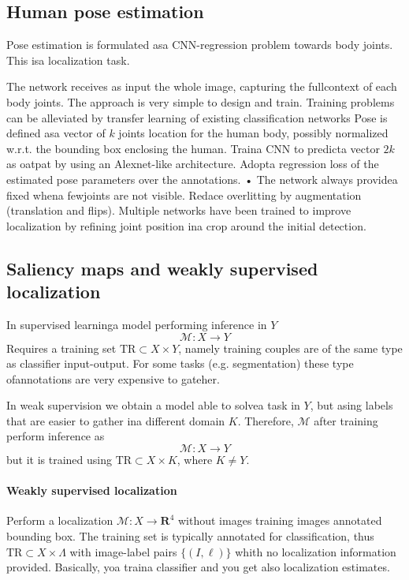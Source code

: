 \subsection{Human pose estimation}
Pose estimation is formulated asa CNN-regression problem towards body
joints. This isa localization task. 

The network receives as input the whole image, capturing the fullcontext of each body joints.
The approach is very simple to design and train. Training problems can
be alleviated by transfer learning of existing classification networks
Pose is defined asa vector of $k$ joints location for the human body,
possibly normalized w.r.t. the bounding box enclosing the human.
Traina CNN to predicta vector  $2k$ as oatpat by using an Alexnet-like
architecture.
Adopta regression loss of the estimated pose parameters over the
annotations.
• The network always providea fixed whena fewjoints are not visible.
Redace overlitting by augmentation (translation and flips).
Multiple networks have been trained to improve localization by refining
joint position ina crop around the initial detection.


\subsection{Saliency maps and weakly supervised localization}
In supervised learninga model  performing inference in $Y$
\[\mathcal{M}:X\rightarrow Y\]
Requires a training set $\text{TR}\subset X \times Y$, namely training couples are of the same type as classifier input-output.
For some tasks (e.g. segmentation) these type ofannotations are very expensive to gateher.

In weak supervision we obtain a model able to solvea task in $Y$, but asing labels that are easier to gather ina different domain $K$. Therefore, $\mathcal{M}$ after training perform inference as
\[\mathcal{M}:X \rightarrow Y\]
but it is trained using $\text{TR}\subset X \times K$, where $K \neq Y$. 

\paragraph*{Weakly supervised localization}
Perform a localization $\mathcal{M}:X\rightarrow\mathbf{R}^4$ without images training images annotated bounding box.
The training set is typically annotated for classification, thus $\text{TR}\subset X \times \Lambda$ with image-label pairs $\{(I,\ell)\}$ whith no localization information provided.
Basically, yoa traina classifier and you get also localization estimates.

